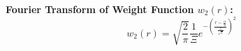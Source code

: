 \documentclass[letterpaper,twocolumn,amsmath,amssymb,prb]{revtex4-1}
\begin{document}
\begin{widetext}
\noindent\textbf{Fourier Transform of Weight Function $w_2(r)$:}
\begin{equation}{w_2(r)=\sqrt{\frac{2}{\pi}}\frac{1}{\Xi}e^{-\left(\frac{r-\frac{\alpha}{2}}{\frac{\Xi}{\sqrt{2}}}\right)^2}}\end{equation}


\end{widetext}
\end{document}
